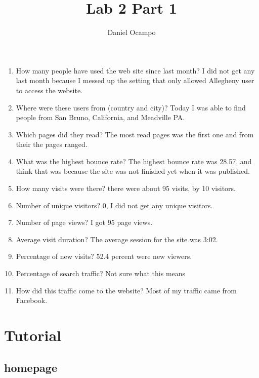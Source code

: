 \documentclass{article}
\begin{document}
\title{Lab 2 Part 1 }
\author{Daniel Ocampo}

\maketitle
\begin{enumerate}
    
\section{Questions in Red}    

\item How many people have used the web site since last month?
I did not get any last month because I messed up the setting that only allowed Allegheny user to access the website.
\item  Where were these users from (country and city)?
Today I was able to find people from San Bruno, California, and Meadville PA.  
\item  Which pages did they read?
The most read pages was the first one and from their the pages ranged. 
\item  What was the highest bounce rate?
The highest bounce rate was 28.57, and think that was because the site was not finished yet when it was published. 
\item  How many visits were there?
there were about 95 visits, by 10 visitors.  
\item  Number of unique visitors?
0, I did not get any unique visitors.  
\item  Number of page views?
I got 95 page views. 

\item  Average visit duration?
The average session for the site was 3:02.  

\item  Percentage of new visits?
52.4 percent were new viewers. 
\item  Percentage of search traffic?
Not sure what this means 
\item  How did this traffic come to the website?
Most of my traffic came from Facebook. 

\end{enumerate}


\newpage
\section{Tutorial}
\subsection{homepage} 
\end{document}
